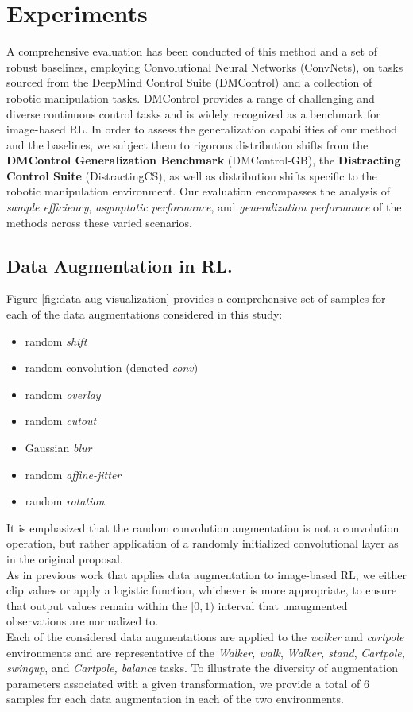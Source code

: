 \newpage
\section{Experiments}

A comprehensive evaluation has been conducted of this method and a set of robust baselines, employing Convolutional Neural Networks (ConvNets), on tasks sourced from the DeepMind Control Suite (DMControl) and a collection of robotic manipulation tasks. DMControl provides a range of challenging and diverse continuous control tasks and is widely recognized as a benchmark for image-based RL. In order to assess the generalization capabilities of our method and the baselines, we subject them to rigorous distribution shifts from the \textbf{DMControl Generalization Benchmark} (DMControl-GB), the \textbf{Distracting Control Suite} (DistractingCS), as well as distribution shifts specific to the robotic manipulation environment. Our evaluation encompasses the analysis of \textit{sample efficiency}, \textit{asymptotic performance}, and \textit{generalization performance} of the methods across these varied scenarios.


\newpage
\subsection{\textbf{Data Augmentation in RL.}}

Figure \ref{fig:data-aug-visualization} provides a comprehensive set of samples for each of the data augmentations considered in this study: 
\begin{itemize}
    \item random \textit{shift}
    \item random convolution (denoted \textit{conv})
    \item random \textit{overlay}
    \item random \textit{cutout}
    \item Gaussian \textit{blur}
    \item random \textit{affine-jitter}
    \item random \textit{rotation}
\end{itemize}
It is emphasized that the random convolution augmentation is not a convolution operation, but rather application of a randomly initialized convolutional layer as in the original proposal.\\
As in previous work  that applies data augmentation to image-based RL, we either clip values or apply a logistic function, whichever is more appropriate, to ensure that output values remain within the $[0, 1)$ interval that unaugmented observations are normalized to. \\
Each of the considered data augmentations are applied to the \textit{walker} and \textit{cartpole} environments and are representative of the \textit{Walker, walk}, \textit{Walker, stand}, \textit{Cartpole, swingup}, and \textit{Cartpole, balance} tasks. To illustrate the diversity of augmentation parameters associated with a given transformation, we provide a total of 6 samples for each data augmentation in each of the two environments. \\

